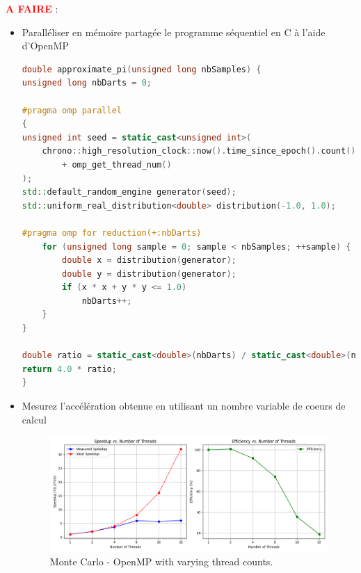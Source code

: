 \documentclass[11pt,a4paper]{article}
\begin{document}

\pagebreak
\textbf{\textcolor{red}{A FAIRE}} : 
\begin{itemize}
\item Paralléliser en mémoire partagée le programme séquentiel en C à l'aide d'OpenMP

\begin{lstlisting}[language=C++, caption=Monte Carlo et OpenMP]
double approximate_pi(unsigned long nbSamples) {
unsigned long nbDarts = 0;

#pragma omp parallel
{
unsigned int seed = static_cast<unsigned int>(
	chrono::high_resolution_clock::now().time_since_epoch().count()
		+ omp_get_thread_num()
);
std::default_random_engine generator(seed);
std::uniform_real_distribution<double> distribution(-1.0, 1.0);

#pragma omp for reduction(+:nbDarts)
	for (unsigned long sample = 0; sample < nbSamples; ++sample) {
		double x = distribution(generator);
		double y = distribution(generator);
		if (x * x + y * y <= 1.0)
			nbDarts++;
	}
}

double ratio = static_cast<double>(nbDarts) / static_cast<double>(nbSamples);
return 4.0 * ratio;
}
\end{lstlisting}
	

\item Mesurez l'accélération obtenue en utilisant un nombre variable de coeurs de calcul

\begin{figure}[H]
	\centering
	\includegraphics[width=\dimexpr\textwidth]{sources/calcul_pi/plot.png}
	\caption{Monte Carlo - OpenMP with varying thread counts.}
\end{figure}



\end{itemize}
\end{document}
